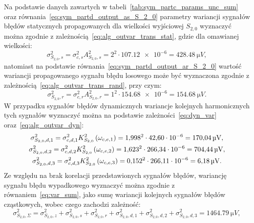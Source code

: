 Na podstawie danych zawartych w tabeli~\ref{tab:sym_partc_params_unc_sum} oraz równania~\eqref{eq:sym_partd_output_as_S_2_0} parametry wariancji sygnałów błędów statycznych propagowanych dla wielkości wyjściowej $S_{2,0}$ wyznaczyć można zgodnie z zależnością~\eqref{eq:alg_outvar_trans_stat}, gdzie dla omawianej wielkości:
\begin{equation}
\sigma_{S_{2,0},s}^{2} = \sigma_{c,s}^{2} A_{S_{2,0},s}^{2} = 2^{2} \cdot \num{107.12e-6} = \qty{428.48}{\micro V} \label{eq:sym_partd_output_var_stat_S_2_0},
\end{equation}
natomiast na podstawie równania~\eqref{eq:sym_partd_output_ar_S_2_0} wartość wariancji propagowanego sygnału błędu losowego może być wyznaczona zgodnie z zależnością~\eqref{eq:alg_outvar_trans_rand}, przy czym:
\begin{equation}
\sigma_{S_{2,0},r}^{2} = \sigma_{c,r}^{2} A_{S_{2,0},r}^{2} = 1^{2} \cdot \num{154.68e-6} = \qty{154.68}{\micro V} \label{eq:sym_partd_output_var_rand_S_2_0}.
\end{equation}
W przypadku sygnałów błędów dynamicznych wariancje kolejnych harmonicznych tych sygnałów wyznaczyć można na podstawie zależności~\eqref{eq:dyn_var} oraz~\eqref{eq:alg_outvar_dyn}:
\begin{gather}
\sigma_{S_{2,0},d,1}^{2} = \sigma_{c,d,1}^{2} K_{S_{2,0}}^{2} \left(\omega_{c,e,1}\right) = \num{1.998}^{2} \cdot \num{42.60e-6} = \qty{170.04}{\micro V} \label{eq:sym_partd_output_var_dyn_1_S_2_0}, \\
\sigma_{S_{2,0},d,2}^{2} = \sigma_{c,d,2}^{2} K_{S_{2,0}}^{2} \left(\omega_{c,e,2}\right) = \num{1.623}^{2} \cdot \num{266.34e-6} = \qty{704.44}{\micro V} \label{eq:sym_partd_output_var_dyn_2_S_2_0}, \\
\sigma_{S_{2,0},d,3}^{2} = \sigma_{c,d,3}^{2} K_{S_{2,0}}^{2} \left(\omega_{c,e,3}\right) = \num{0.152}^{2} \cdot \num{266.11e-6} = \qty{6.18}{\micro V} \label{eq:sym_partd_output_var_dyn_3_S_2_0}.
\end{gather}
Ze względu na brak korelacji przedstawionych sygnałów błędów, wariancję sygnału błędu wypadkowego wyznaczyć można zgodnie z równaniem~\eqref{eq:var_sum}, jako sumę wariancji kolejnych sygnałów błędów cząstkowych, wobec czego zachodzi zależność:
\begin{equation}
\sigma_{S_{2,0},\Sigma}^{2} = \sigma_{S_{2,0},z}^{2} + \sigma_{S_{2,0},s}^{2} + \sigma_{S_{2,0},r}^{2} + \sigma_{S_{2,0},d,1}^{2} + \sigma_{S_{2,0},d,2}^{2} + \sigma_{S_{2,0},d,3}^{2} = \qty{1464.79}{\micro V} \label{eq:sym_partd_output_var_sum_S_2_0},
\end{equation}
